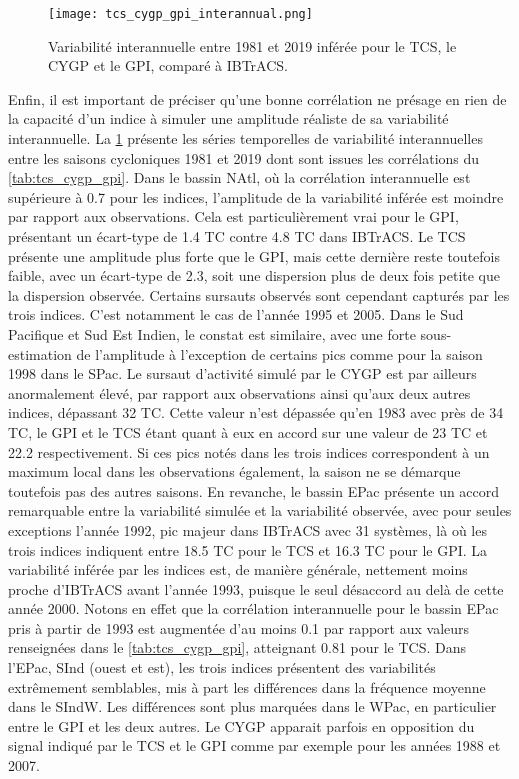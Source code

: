 \documentclass[../main.tex]{subfiles}
\begin{document}
\begin{figure}[tb]
    \centering
    \texttt{[image: tcs\_cygp\_gpi\_interannual.png]}
    \caption{Variabilité interannuelle entre 1981 et 2019 inférée pour le TCS, le CYGP et le GPI, comparé à IBTrACS.}
    \label{fig:tcs_cygp_gpi_variabilite}
\end{figure}

Enfin, il est important de préciser qu'une bonne corrélation ne présage en rien de la capacité d'un indice à simuler une amplitude réaliste de sa variabilité
interannuelle. La \cref{fig:tcs_cygp_gpi_variabilite} présente les séries temporelles de variabilité interannuelles entre les saisons cycloniques \num{1981} et
\num{2019} dont sont issues les corrélations du \cref{tab:tcs_cygp_gpi}. Dans le bassin NAtl, où la corrélation interannuelle est supérieure à \num{0.7} pour
les indices, l'amplitude de la variabilité inférée est moindre par rapport aux observations. Cela est particulièrement vrai pour le GPI, présentant un
écart-type de \num{1.4} TC contre \num{4.8} TC dans IBTrACS. Le TCS présente une amplitude plus forte que le GPI, mais cette dernière reste toutefois faible,
avec un écart-type de \num{2.3}, soit une dispersion plus de deux fois petite que la dispersion observée. Certains sursauts observés sont cependant capturés par
les trois indices. C'est notamment le cas de l'année \num{1995} et \num{2005}. Dans le Sud Pacifique et Sud Est Indien, le constat est similaire, avec une forte
sous-estimation de l'amplitude à l'exception de certains pics comme pour la saison \num{1998} dans le SPac. Le sursaut d'activité simulé par le CYGP est par
ailleurs anormalement élevé, par rapport aux observations ainsi qu'aux deux autres indices, dépassant \num{32} TC. Cette valeur n'est dépassée qu'en \num{1983}
avec près de \num{34} TC, le GPI et le TCS étant quant à eux en accord sur une valeur de \num{23} TC et \num{22.2} respectivement. Si ces pics notés dans les
trois indices correspondent à un maximum local dans les observations également, la saison ne se démarque toutefois pas des autres saisons. En revanche, le
bassin EPac présente un accord remarquable entre la variabilité simulée et la variabilité observée, avec pour seules exceptions l'année \num{1992}, pic majeur
dans IBTrACS avec \num{31} systèmes, là où les trois indices indiquent entre \num{18.5} TC pour le TCS et \num{16.3} TC pour le GPI. La variabilité inférée par
les indices est, de manière générale, nettement moins proche d'IBTrACS avant l'année \num{1993}, puisque le seul désaccord au delà de cette année \num{2000}.
Notons en effet que la corrélation interannuelle pour le bassin EPac pris à partir de \num{1993} est augmentée d'au moins \num{0.1} par rapport aux valeurs
renseignées dans le \cref{tab:tcs_cygp_gpi}, atteignant \num{0.81} pour le TCS. Dans l'EPac, SInd (ouest et est), les trois indices présentent des variabilités
extrêmement semblables, mis à part les différences dans la fréquence moyenne dans le SIndW. Les différences sont plus marquées dans le WPac, en particulier
entre le GPI et les deux autres. Le CYGP apparait parfois en opposition du signal indiqué par le TCS et le GPI comme par exemple pour les années \num{1988} et
\num{2007}.
\end{document}

